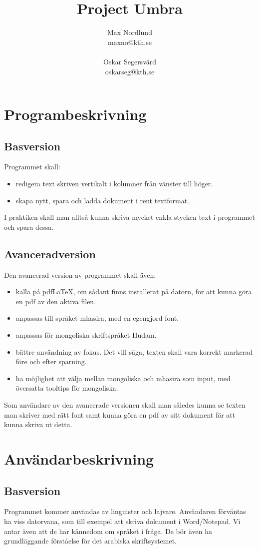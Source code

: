 \documentclass[a4paper,11p,twoside]{report}
\title{Project Umbra}
\author{Max Nordlund\\ maxno@kth.se \\ \\ Oskar Segersvärd \\ oskarseg@kth.se}
\begin{document}
\maketitle

\pagebreak

\section{Programbeskrivning}
\subsection{Basversion}
Programmet skall:
\begin{itemize}
	\item redigera text skriven vertikalt i kolumner från vänster till höger.
	\item skapa nytt, spara och ladda dokument i rent textformat.
\end{itemize}
I praktiken skall man alltså kunna skriva mycket enkla stycken text i programmet och spara dessa.

\subsection{Avanceradversion}
Den avancerad version av programmet skall även:
\begin{itemize}
	\item kalla på pdf\LaTeX, om sådant finns installerat på datorn, för att kunna göra en pdf av den aktiva filen.
	\item anpassas till språket mhasira, med en egengjord font.
	\item anpassas för mongoliska skriftspråket Hudam.
	\item bättre användning av fokus. Det vill säga, texten skall vara korrekt markerad före och efter sparning.
	\item ha möjlighet att välja mellan mongoliska och mhasira som input, med översatta tooltips för mongoliska.
\end{itemize}
Som användare av den avancerade versionen skall man således kunna se texten man skriver med rätt font samt kunna göra en pdf av sitt dokument för att kunna skriva ut detta.

\section{Användarbeskrivning}
\subsection{Basversion}
Programmet kommer användas av linguister och lajvare. Användaren förväntas ha viss datorvana, som till exempel att skriva dokument i Word/Notepad. Vi antar även att de har kännedom om språket i fråga. De bör även ha grundläggande förståelse för det arabiska skriftsystemet. 
\end{document}
